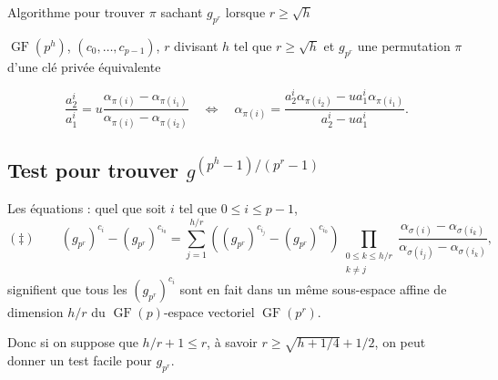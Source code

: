 \documentclass[a4paper, titlepage]{article}
\theoremstyle{definition}
\theoremstyle{remark}
\def\gf{\operatorname{GF}}
\begin{document}
\begin{algorithm}[h]
\caption{Algorithme pour trouver $\pi$ sachant $g_{p^r}$ lorsque $r\geqslant \sqrt h$}
\label{algogpr}
\begin{algorithmic}[1]
\REQUIRE $\gf(p^h)$, $(c_0,\dots, c_{p-1})$, $r$ divisant $h$ tel que $r\geqslant \sqrt h$ et $g_{p^r}$
\ENSURE une permutation $\pi$ d'une clé privée équivalente
\FORALL{$u$ dans $\gf(p)$} 
	\ENDFOR
		\RETURN{$\pi$}
	\ENDIF
\ENDFOR
\end{algorithmic}
\end{algorithm}

$$\frac{a_2^i}{a_1^i} = u \frac{\alpha_{\pi(i)}-\alpha_{\pi(i_1)}}{\alpha_{\pi(i)}-\alpha_{\pi(i_2)}}
\quad\Leftrightarrow\quad
\alpha_{\pi(i)} = \frac{a_2^i\alpha_{\pi(i_2)}-ua_1^i\alpha_{\pi(i_1)}}{a_2^i-ua_1^i}.$$

\subsection{Test pour trouver $g^{(p^h-1)/(p^r-1)}$}

Les équations : quel que soit $i$ tel que $0\leqslant i \leqslant p-1$,
$$(\ddagger) \qquad (g_{p^r})^{c_i} - (g_{p^r})^{c_{i_0}} = \sum_{j=1}^{h/r} \left((g_{p^r})^{c_{i_j}} - (g_{p^r})^{c_{i_0}} \right)\prod_{\substack{0\leqslant k\leqslant h/r \\ k \neq j}} \frac{\alpha_{\sigma(i)}-\alpha_{\sigma(i_k)}}{\alpha_{\sigma(i_j)}-\alpha_{\sigma(i_k)}},$$
signifient que tous les $(g_{p^r})^{c_i}$ sont en fait dans un même sous-espace affine de dimension $h/r$ du $\gf(p)$-espace vectoriel $\gf(p^r)$. 

Donc si on suppose que $h/r + 1 \leqslant r$, à savoir $r \geqslant \sqrt{h + 1/4} + 1/2$, on peut donner un test facile pour $g_{p^r}$.
\end{document}
